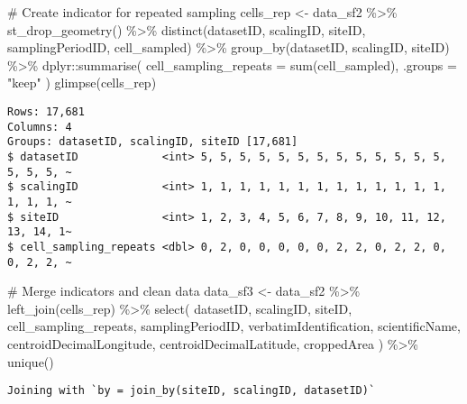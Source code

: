 \documentclass[
  letterpaper,
  DIV=11,
  numbers=noendperiod]{scrreprt}
\newenvironment{Shaded}{\begin{snugshade}}{\end{snugshade}}
\newcommand{\AttributeTok}[1]{\textcolor[rgb]{0.40,0.45,0.13}{#1}}
\newcommand{\CommentTok}[1]{\textcolor[rgb]{0.37,0.37,0.37}{#1}}
\newcommand{\FunctionTok}[1]{\textcolor[rgb]{0.28,0.35,0.67}{#1}}
\newcommand{\NormalTok}[1]{\textcolor[rgb]{0.00,0.23,0.31}{#1}}
\newcommand{\OtherTok}[1]{\textcolor[rgb]{0.00,0.23,0.31}{#1}}
\newcommand{\SpecialCharTok}[1]{\textcolor[rgb]{0.37,0.37,0.37}{#1}}
\newcommand{\StringTok}[1]{\textcolor[rgb]{0.13,0.47,0.30}{#1}}
\begin{document}
\begin{Shaded}
\begin{Highlighting}[]
\CommentTok{\# Create indicator for repeated sampling}
\NormalTok{cells\_rep }\OtherTok{\textless{}{-}}\NormalTok{ data\_sf2 }\SpecialCharTok{\%\textgreater{}\%}
  \FunctionTok{st\_drop\_geometry}\NormalTok{() }\SpecialCharTok{\%\textgreater{}\%}
  \FunctionTok{distinct}\NormalTok{(datasetID, scalingID, siteID, samplingPeriodID, cell\_sampled) }\SpecialCharTok{\%\textgreater{}\%}
  \FunctionTok{group\_by}\NormalTok{(datasetID, scalingID, siteID) }\SpecialCharTok{\%\textgreater{}\%}
\NormalTok{  dplyr}\SpecialCharTok{::}\FunctionTok{summarise}\NormalTok{(}
    \AttributeTok{cell\_sampling\_repeats =} \FunctionTok{sum}\NormalTok{(cell\_sampled), }\AttributeTok{.groups =} \StringTok{"keep"}
\NormalTok{  )}
\FunctionTok{glimpse}\NormalTok{(cells\_rep)}
\end{Highlighting}
\end{Shaded}

\begin{verbatim}
Rows: 17,681
Columns: 4
Groups: datasetID, scalingID, siteID [17,681]
$ datasetID             <int> 5, 5, 5, 5, 5, 5, 5, 5, 5, 5, 5, 5, 5, 5, 5, 5, ~
$ scalingID             <int> 1, 1, 1, 1, 1, 1, 1, 1, 1, 1, 1, 1, 1, 1, 1, 1, ~
$ siteID                <int> 1, 2, 3, 4, 5, 6, 7, 8, 9, 10, 11, 12, 13, 14, 1~
$ cell_sampling_repeats <dbl> 0, 2, 0, 0, 0, 0, 0, 2, 2, 0, 2, 2, 0, 0, 2, 2, ~
\end{verbatim}

\begin{Shaded}
\begin{Highlighting}[]
\CommentTok{\# Merge indicators and clean data}
\NormalTok{data\_sf3 }\OtherTok{\textless{}{-}}\NormalTok{ data\_sf2 }\SpecialCharTok{\%\textgreater{}\%}
  \FunctionTok{left\_join}\NormalTok{(cells\_rep) }\SpecialCharTok{\%\textgreater{}\%}
  \FunctionTok{select}\NormalTok{(}
\NormalTok{    datasetID, scalingID, siteID,}
\NormalTok{    cell\_sampling\_repeats, samplingPeriodID,}
\NormalTok{    verbatimIdentification, scientificName,}
\NormalTok{    centroidDecimalLongitude, centroidDecimalLatitude,}
\NormalTok{    croppedArea}
\NormalTok{  ) }\SpecialCharTok{\%\textgreater{}\%}
  \FunctionTok{unique}\NormalTok{()}
\end{Highlighting}
\end{Shaded}

\begin{verbatim}
Joining with `by = join_by(siteID, scalingID, datasetID)`
\end{verbatim}
\end{document}
